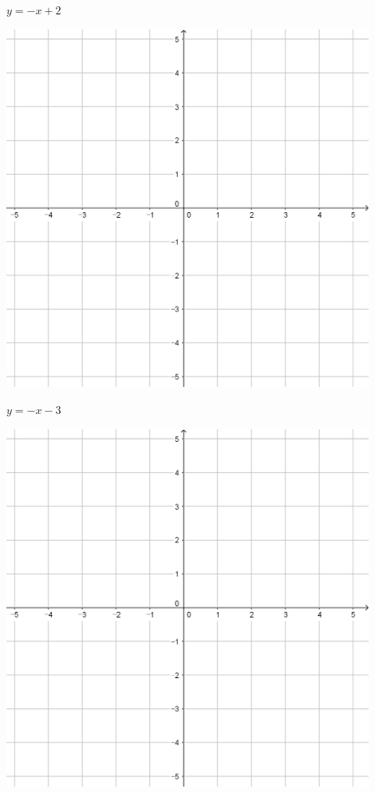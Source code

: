 \documentclass[a4paper]{oblivoir}
\begin{document}
\begin{minipage}{0.45\textwidth}\centering
\(y=-x+2\)
\par\bigskip\includegraphics[width=0.9\textwidth]{55}
\end{minipage}
\begin{minipage}{0.45\textwidth}\centering
\(y=-x-3\)
\par\bigskip\includegraphics[width=0.9\textwidth]{55}
\end{minipage}\bigskip\bigskip\par
\end{document}
